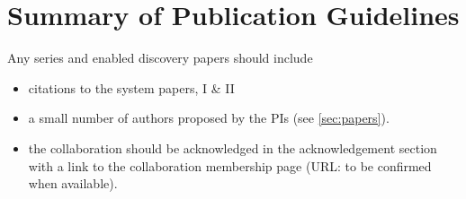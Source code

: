 \documentclass[a4paper,twocolumn]{article}
\begin{document}
\section{Summary of Publication Guidelines}
\label{sec:publ}
Any \sw series and \sw enabled discovery papers should include
\begin{itemize}
\item citations to the \sw system papers, \sw I \& II
\item a small number of \sw authors proposed by the \sw PIs (see \ref{sec:papers}).
\item the collaboration should be acknowledged in the acknowledgement section with a link to the collaboration membership page (URL: to be confirmed when available).
\end{itemize}


\end{document}
